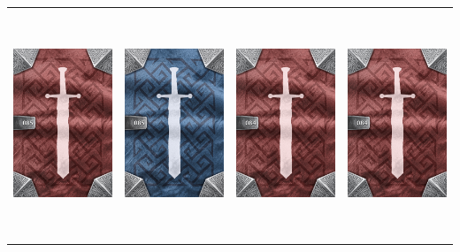 \documentclass{minimal}
\begin{document}
{\begin{longtable}{llll}
\includegraphics[width=44mm,height=68mm]{./64-151/gh-085b-wand-of-infernos-back.png} &
\includegraphics[width=44mm,height=68mm]{./64-151/gh-085a-wand-of-infernos-back.png} &
\includegraphics[width=44mm,height=68mm]{./64-151/gh-084b-wand-of-storms-back.png} &
\includegraphics[width=44mm,height=68mm]{./64-151/gh-084b-wand-of-storms-back.png}\\ 

\end{longtable}}
\end{document}
